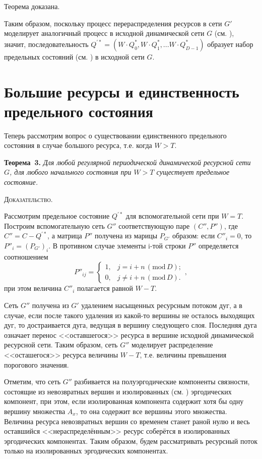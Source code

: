 \documentclass[a4paper,12pt]{article}
\begin{document}
		Теорема доказана.

Таким образом, поскольку процесс перераспределения ресурсов в сети $G'$ моделирует аналогичный процесс в исходной динамической сети $G$ (см. \cite{SvSkor:SkorAbdur}), значит, последовательность $Q^{\prime *}=\left(W\cdot Q^*_0, W\cdot Q^*_1, ... W \cdot Q^*_{D-1}\right)$ образует набор предельных состояний (см. \cite{SvSkor:Zhil1}) в исходной сети $G$.


	\section{Большие ресурсы и единственность предельного состояния}
	
	\indent
	
	Теперь рассмотрим вопрос о существовании единственного предельного состояния в случае большого ресурса, т.е. когда $W>T$.
		
{\bf Теорема~3. }{\it 
Для любой регулярной периодической динамической ресурсной сети $G$, для любого начального состояния при $W>T$ существует предельное состояние.
}		

\textsc{Доказательство. }

Рассмотрим предельное состояние $Q^{\prime *}$ для вспомогательной сети при $W=T$. Построим вспомогательную сеть $G''$ соответствующую паре $(C'',P'')$, где $C''=C-Q^{\prime *}$, а матрица $P''$ получена из марицы $P_{G'}$ образом: если $C''_i= 0$, то $P''_i=(P_{G'})_i$. В противном случае элементы i-той строки $P''$ определяется соотношением
$$P''_{ij}=\left\{\begin{array}{ll}
1,& j=    i+n\, (\mathrm{mod}\, D);\\
0,& j\neq i+n\, (\mathrm{mod}\, D).
\end{array}
\right.,$$ при этом величина $C''_i$ полагается равной $W-T$.

Сеть $G''$ получена из $G'$ удалением насыщенных ресурсным потоком дуг, а в случае, если после такого удаления из какой-то вершины не осталось выходящих дуг, то достраивается дуга, ведущая в вершину следующего слоя. Последняя дуга означает перенос <<оставшегося>> ресурса в вершине исходной динамической ресурсной сети. Таким образом, сеть $G''$ моделирует распределение <<осташегося>> ресурса величины $W-T$, т.е. величины превышения порогового значения.

Отметим, что сеть $G''$ разбивается на полуэргодические компоненты связности, состоящие из невозвратных вершин и изолированных (см. \cite{SvSkor:Skor2}) эргодических компонент, при этом, если изолированная компонента содержит хотя бы одну вершину множества $A_x$, то она содержит все вершины этого множества. Величина ресурса невозвратных вершин со временем станет раной нулю и весь оставшийся <<нераспределённым>> ресурс соберётся в изолированных эргодических компонентах. Таким образом, будем рассматривать ресурсный поток только на изолированных эргодических компонентах.
\end{document}
